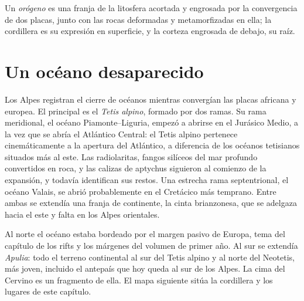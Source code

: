 \begin{definition}[Orógeno]\label{def:b2:alpine-orogen:orogen}
Un \emph{orógeno} es una franja de la litosfera acortada y engrosada por la
convergencia de dos placas, junto con las rocas deformadas y metamorfizadas en ella; la
cordillera es su expresión en superficie, y la corteza engrosada de debajo, su raíz.
\end{definition}

\section{Un océano desaparecido}\label{sec:b2:alpine-orogen:tethys}

Los Alpes registran el cierre de océanos mientras convergían las placas africana y europea.
El principal es el \emph{Tetis alpino}, formado por dos ramas. Su rama meridional, el
océano Piamonte--Liguria, empezó a abrirse en el Jurásico Medio, a la vez que se abría el Atlántico
Central: el Tetis alpino pertenece cinemáticamente a la apertura del Atlántico, a diferencia de los
océanos tetisianos situados más al este. Las radiolaritas, fangos silíceos del mar profundo convertidos en roca,
y las calizas de aptychus siguieron al comienzo de la expansión, y todavía identifican sus
restos. Una estrecha rama septentrional, el océano Valais, se abrió probablemente en el Cretácico
más temprano. Entre ambas se extendía una franja de continente, la cinta brianzonesa, que se adelgaza
hacia el este y falta en los Alpes orientales.

Al norte el océano estaba bordeado por el margen pasivo de Europa, tema del capítulo de los rifts y
los márgenes del volumen de primer año. Al sur se extendía \emph{Apulia}: todo el terreno continental
al sur del Tetis alpino y al norte del Neotetis, más joven, incluido el antepaís
que hoy queda al sur de los Alpes. La cima del Cervino es un fragmento de ella.
El mapa siguiente sitúa la cordillera y los lugares de este capítulo.

